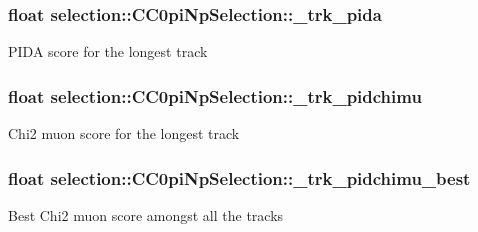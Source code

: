 \subsubsection[{\texorpdfstring{\+\_\+trk\+\_\+pida}{_trk_pida}}]{\setlength{\rightskip}{0pt plus 5cm}float selection\+::\+C\+C0pi\+Np\+Selection\+::\+\_\+trk\+\_\+pida\hspace{0.3cm}{\ttfamily [private]}}\hypertarget{classselection_1_1CC0piNpSelection_af0fe49227e33b3f46015a821de58ba1f}{}\label{classselection_1_1CC0piNpSelection_af0fe49227e33b3f46015a821de58ba1f}
P\+I\+DA score for the longest track 
\subsubsection[{\texorpdfstring{\+\_\+trk\+\_\+pidchimu}{_trk_pidchimu}}]{\setlength{\rightskip}{0pt plus 5cm}float selection\+::\+C\+C0pi\+Np\+Selection\+::\+\_\+trk\+\_\+pidchimu\hspace{0.3cm}{\ttfamily [private]}}\hypertarget{classselection_1_1CC0piNpSelection_a74ddf5622f3ee32110e9342361020a89}{}\label{classselection_1_1CC0piNpSelection_a74ddf5622f3ee32110e9342361020a89}
Chi2 muon score for the longest track 
\subsubsection[{\texorpdfstring{\+\_\+trk\+\_\+pidchimu\+\_\+best}{_trk_pidchimu_best}}]{\setlength{\rightskip}{0pt plus 5cm}float selection\+::\+C\+C0pi\+Np\+Selection\+::\+\_\+trk\+\_\+pidchimu\+\_\+best\hspace{0.3cm}{\ttfamily [private]}}\hypertarget{classselection_1_1CC0piNpSelection_a04216d0564f79f3c4a267130cd70e753}{}\label{classselection_1_1CC0piNpSelection_a04216d0564f79f3c4a267130cd70e753}
Best Chi2 muon score amongst all the tracks 
